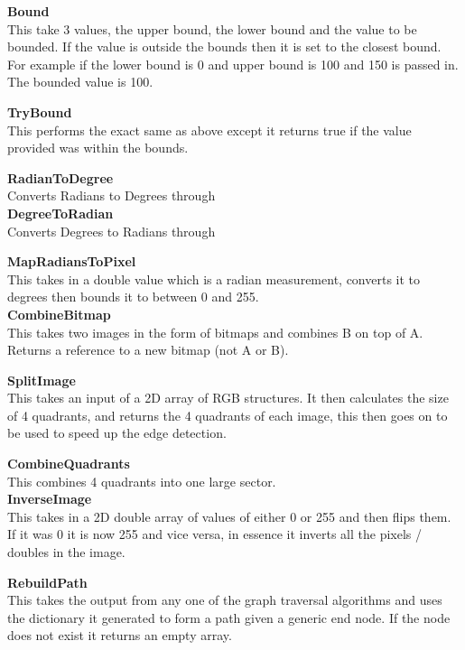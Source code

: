 \begin{FlushLeft}
    \textbf{Bound} \\ \bk
    This take 3 values, the upper bound, the lower bound and the value to be bounded. If the value is outside the bounds then it is set to the closest bound. For example if the lower bound is 0 and upper bound is 100 and 150 is passed in. The bounded value is 100.\\\bk

    \textbf{TryBound} \\ \bk
    This performs the exact same as above except it returns true if the value provided was within the bounds.\\\bk

    \textbf{RadianToDegree} \\ \bk
    Converts Radians to Degrees through \\\bk
    \textbf{DegreeToRadian} \\ \bk
    Converts Degrees to Radians through \\\bk

    \textbf{MapRadiansToPixel} \\ \bk
    This takes in a double value which is a radian measurement, converts it to degrees then bounds it to between 0 and 255.\\\bk
    \textbf{CombineBitmap} \\ \bk
    This takes two images in the form of bitmaps and combines B on top of A. Returns a reference to a new bitmap (not A or B).\\\bk

    \textbf{SplitImage} \\ \bk
    This takes an input of a 2D array of RGB structures. It then calculates the size of 4 quadrants, and returns the 4 quadrants of each image, this then goes on to be used to speed up the edge detection.\\\bk
    
    \textbf{CombineQuadrants} \\ \bk
    This combines 4 quadrants into one large sector.\\\bk
    \textbf{InverseImage} \\ \bk
    This takes in a 2D double array of values of either 0 or 255 and then flips them. If it was 0 it is now 255 and vice versa, in essence it inverts all the pixels / doubles in the image.\\\bk

    \textbf{RebuildPath} \\ \bk
    This takes the output from any one of the graph traversal algorithms and uses the dictionary it generated to form a path given a generic end node. If the node does not exist it returns an empty array.\\\bk
    

\end{FlushLeft}
